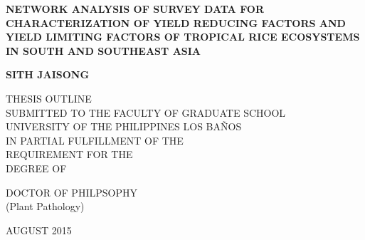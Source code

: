 \pagestyle{empty}

\begin{titlepage}
\begin{spacing}{1}
        \begin{center}
        \vspace*{0cm}

        \large
        {\bf NETWORK ANALYSIS OF SURVEY DATA FOR CHARACTERIZATION OF YIELD REDUCING FACTORS AND YIELD LIMITING FACTORS OF TROPICAL RICE ECOSYSTEMS IN SOUTH AND SOUTHEAST ASIA}

        \vspace*{6.0cm}

        \large
        \bf{SITH JAISONG} \\

        \vspace*{5.0cm}

        \large
        THESIS OUTLINE \\ SUBMITTED TO THE FACULTY OF GRADUATE SCHOOL\\
        UNIVERSITY OF THE PHILIPPINES LOS BA\~NOS\\ 
 IN PARTIAL FULFILLMENT OF THE \\
        REQUIREMENT FOR THE \\ 
        DEGREE OF \\
        \vspace*{2.0cm}
        \begin{singlespace}
        DOCTOR OF PHILPSOPHY \\
        (Plant Pathology) \\
		\end{singlespace}
        \vspace*{2.0cm}
        AUGUST 2015
        \end{center}
        \end{spacing}
\end{titlepage}
\cleardoublepage
